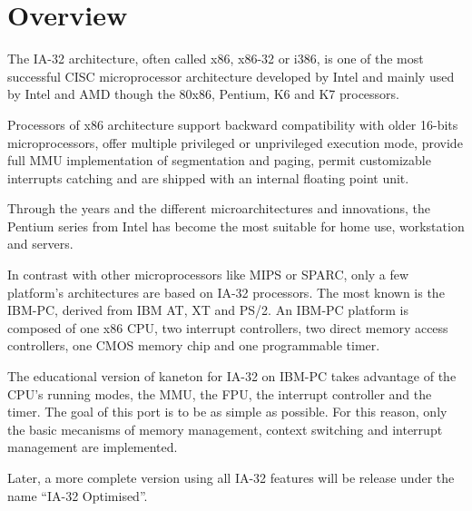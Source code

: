%
%
%
%
%
%

%
%

\chapter{Overview}

The IA-32 architecture, often called x86, x86-32 or i386, is one of
the most successful CISC microprocessor architecture developed by
Intel and mainly used by Intel and AMD though the 80x86, Pentium, K6
and K7 processors.

Processors of x86 architecture support backward compatibility with
older 16-bits microprocessors, offer multiple privileged or
unprivileged execution mode, provide full MMU implementation of
segmentation and paging, permit customizable interrupts catching and
are shipped with an internal floating point unit.

Through the years and the different microarchitectures and
innovations, the Pentium series from Intel has become the most
suitable for home use, workstation and servers.

In contrast with other microprocessors like MIPS or SPARC, only a few
platform's architectures are based on IA-32 processors. The most known
is the IBM-PC, derived from IBM AT, XT and PS/2. An IBM-PC platform is
composed of one x86 CPU, two interrupt controllers, two direct memory
access controllers, one CMOS memory chip and one programmable timer.

The educational version of kaneton for IA-32 on IBM-PC takes advantage
of the CPU's running modes, the MMU, the FPU, the interrupt controller
and the timer. The goal of this port is to be as simple as
possible. For this reason, only the basic mecanisms of memory
management, context switching and interrupt management are
implemented.

Later, a more complete version using all IA-32 features will be
release under the name ``IA-32 Optimised''.
